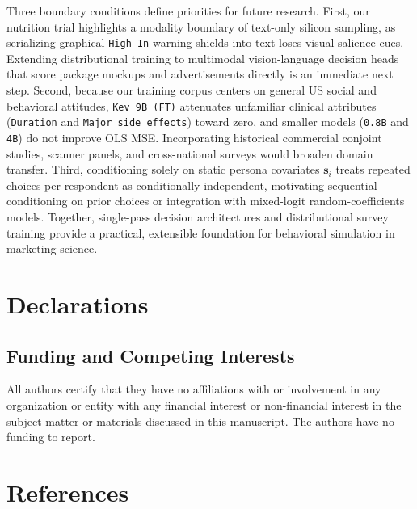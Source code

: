 \documentclass[
  11pt,
  letterpaper,
]{article}
\begin{document}
Three boundary conditions define priorities for future research. First,
our nutrition trial highlights a modality boundary of text-only silicon
sampling, as serializing graphical \texttt{High\ In} warning shields
into text loses visual salience cues. Extending distributional training
to multimodal vision-language decision heads that score package mockups
and advertisements directly is an immediate next step. Second, because
our training corpus centers on general US social and behavioral
attitudes, \texttt{Kev\ 9B\ (FT)} attenuates unfamiliar clinical
attributes (\texttt{Duration} and \texttt{Major\ side\ effects}) toward
zero, and smaller models (\texttt{0.8B} and \texttt{4B}) do not improve
OLS MSE. Incorporating historical commercial conjoint studies, scanner
panels, and cross-national surveys would broaden domain transfer. Third,
conditioning solely on static persona covariates \(\mathbf{s}_i\) treats
repeated choices per respondent as conditionally independent, motivating
sequential conditioning on prior choices or integration with mixed-logit
random-coefficients models. Together, single-pass decision architectures
and distributional survey training provide a practical, extensible
foundation for behavioral simulation in marketing science.

\section*{Declarations}\label{declarations}

\subsection*{Funding and Competing
Interests}\label{funding-and-competing-interests}

All authors certify that they have no affiliations with or involvement
in any organization or entity with any financial interest or
non-financial interest in the subject matter or materials discussed in
this manuscript. The authors have no funding to report.

\section*{References}\label{references}
\end{document}
